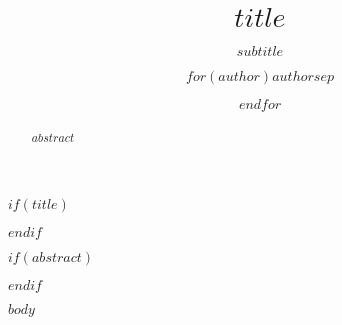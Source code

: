 \documentclass[a4paper, 12pt]{article}
\title{$title$}
\subtitle{$subtitle$}
\author{$for(author)$$author$$sep$ \and $endfor$}
\begin{document}

$if(title)$
\maketitle
$endif$

\clearpage





$if(abstract)$
\begin{abstract}
$abstract$
\end{abstract}
\clearpage
$endif$

%


\tableofcontents
\clearpage




$body$


%

%

%
% 
% 
%
% 

%
\end{document}
